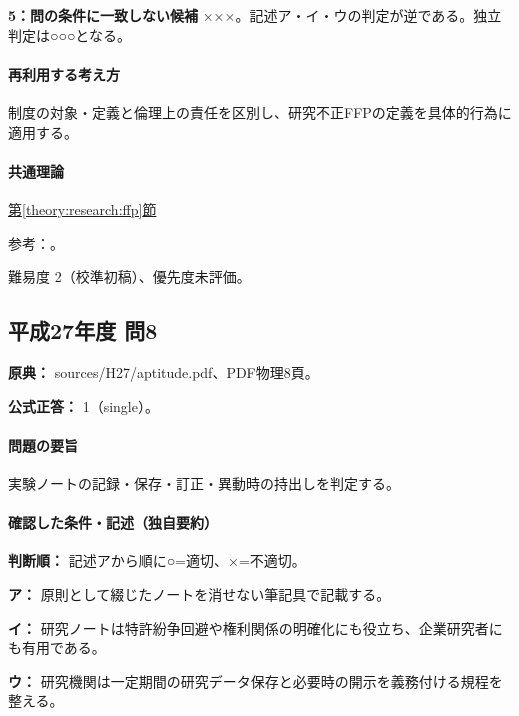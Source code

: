 \noindent\textbf{5：問の条件に一致しない候補} ×××。記述ア・イ・ウの判定が逆である。独立判定は○○○となる。\par

\paragraph{再利用する考え方} 制度の対象・定義と倫理上の責任を区別し、研究不正FFPの定義を具体的行為に適用する。

\paragraph{共通理論} \hyperref[theory:research:ffp]{第\ref*{theory:research:ffp}節}

\par 参考：\cite{mext_misconduct2014}。

\par 難易度 2（校準初稿）、優先度未評価。

\subsection{平成27年度 問8}
\label{q:h27-reg-apt-08}

\noindent\textbf{原典：} sources/H27/aptitude.pdf、PDF物理8頁。

\textbf{公式正答：} 1（single）。

\paragraph{問題の要旨} 実験ノートの記録・保存・訂正・異動時の持出しを判定する。

\paragraph{確認した条件・記述（独自要約）}\mbox{}\par

\noindent\textbf{判断順：} 記述アから順に○=適切、×=不適切。\par

\noindent\textbf{ア：} 原則として綴じたノートを消せない筆記具で記載する。\par

\noindent\textbf{イ：} 研究ノートは特許紛争回避や権利関係の明確化にも役立ち、企業研究者にも有用である。\par

\noindent\textbf{ウ：} 研究機関は一定期間の研究データ保存と必要時の開示を義務付ける規程を整える。\par

